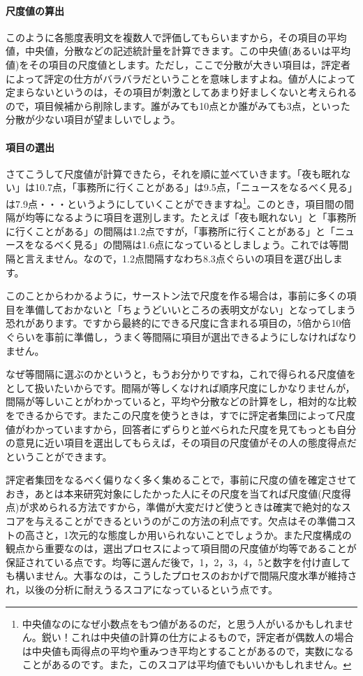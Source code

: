 \documentclass{ltjsbook}
\begin{document}
\paragraph{尺度値の算出}このように各態度表明文を複数人で評価してもらいますから，その項目の平均値，中央値，分散などの記述統計量を計算できます。この中央値(あるいは平均値)をその項目の尺度値とします。ただし，ここで分散が大きい項目は，評定者によって評定の仕方がバラバラだということを意味しますよね。値が人によって定まらないというのは，その項目が刺激としてあまり好ましくないと考えられるので，項目候補から削除します。誰がみても10点とか誰がみても3点，といった分散が少ない項目が望ましいでしょう。

\paragraph{項目の選出}さてこうして尺度値が計算できたら，それを順に並べていきます。「夜も眠れない」は10.7点，「事務所に行くことがある」は9.5点，「ニュースをなるべく見る」は7.9点・・・というようにしていくことができますね\footnote{中央値なのになぜ小数点をもつ値があるのだ，と思う人がいるかもしれません。鋭い！これは中央値の計算の仕方によるもので，評定者が偶数人の場合は中央値も両得点の平均や重みつき平均とすることがあるので，実数になることがあるのです。また，このスコアは平均値でもいいかもしれません。}。このとき，項目間の間隔が均等になるように項目を選別します。たとえば「夜も眠れない」と「事務所に行くことがある」の間隔は1.2点ですが，「事務所に行くことがある」と「ニュースをなるべく見る」の間隔は1.6点になっているとしましょう。これでは等間隔と言えません。なので，1.2点間隔すなわち8.3点ぐらいの項目を選び出します。

このことからわかるように，サーストン法で尺度を作る場合は，事前に多くの項目を準備しておかないと「ちょうどいいところの表明文がない」となってしまう恐れがあります。ですから最終的にできる尺度に含まれる項目の，5倍から10倍ぐらいを事前に準備し，うまく等間隔に項目が選出できるようにしなければなりません。

なぜ等間隔に選ぶのかというと，もうお分かりですね，これで得られる尺度値をとして扱いたいからです。間隔が等しくなければ順序尺度にしかなりませんが，間隔が等しいことがわかっていると，平均や分散などの計算をし，相対的な比較をできるからです。またこの尺度を使うときは，すでに評定者集団によって尺度値がわかっていますから，回答者にずらりと並べられた尺度を見てもっとも自分の意見に近い項目を選出してもらえば，その項目の尺度値がその人の態度得点だということができます。

評定者集団をなるべく偏りなく多く集めることで，事前に尺度の値を確定させておき，あとは本来研究対象にしたかった人にその尺度を当てれば尺度値(尺度得点)が求められる方法ですから，準備が大変だけど使うときは確実で絶対的なスコアを与えることができるというのがこの方法の利点です。欠点はその準備コストの高さと，1次元的な態度しか用いられないことでしょうか。また尺度構成の観点から重要なのは，選出プロセスによって項目間の尺度値が均等であることが保証されている点です。均等に選んだ後で，1，2，3，4，5と数字を付け直しても構いません。大事なのは，こうしたプロセスのおかげで間隔尺度水準が維持され，以後の分析に耐えうるスコアになっているという点です。
\end{document}
